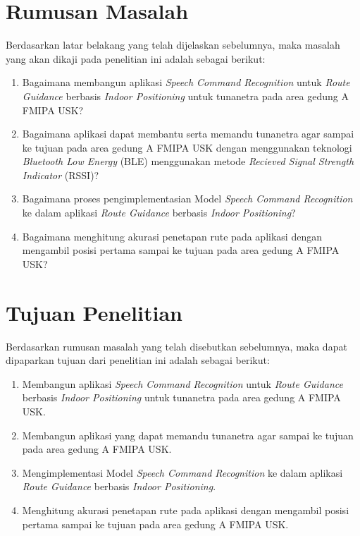 \newpage


\section{Rumusan Masalah}
Berdasarkan latar belakang yang telah dijelaskan sebelumnya, maka masalah yang akan dikaji pada penelitian ini adalah sebagai berikut:
\begin{enumerate}
	\item Bagaimana membangun aplikasi \textit{Speech Command Recognition} untuk \textit{Route Guidance} berbasis \textit{Indoor Positioning} untuk tunanetra pada area gedung A FMIPA USK?
	\item Bagaimana aplikasi dapat membantu serta memandu tunanetra agar sampai ke tujuan pada area gedung A FMIPA USK dengan menggunakan teknologi \textit{Bluetooth Low Energy }(BLE) menggunakan metode \textit{Recieved Signal Strength Indicator} (RSSI)?
	\item Bagaimana proses pengimplementasian Model \textit{Speech Command Recognition} ke dalam aplikasi \textit{Route Guidance} berbasis \textit{Indoor Positioning}?
	\item Bagaimana menghitung akurasi penetapan rute pada aplikasi dengan mengambil posisi pertama sampai ke tujuan pada area gedung A FMIPA USK?
\end{enumerate}

\section{Tujuan Penelitian}
Berdasarkan rumusan masalah yang telah disebutkan sebelumnya, maka dapat dipaparkan tujuan dari penelitian ini adalah sebagai berikut: 
\begin{enumerate}
	\item Membangun aplikasi \textit{Speech Command Recognition} untuk \textit{Route Guidance} berbasis \textit{Indoor Positioning} untuk tunanetra pada area gedung A FMIPA USK.
	\item Membangun aplikasi yang dapat memandu tunanetra agar sampai ke tujuan pada area gedung A FMIPA USK.
	\item Mengimplementasi Model \textit{Speech Command Recognition} ke dalam aplikasi \textit{Route Guidance} berbasis \textit{Indoor Positioning}.
	\item Menghitung akurasi penetapan rute pada aplikasi dengan mengambil posisi pertama sampai ke tujuan pada area gedung A FMIPA USK.
\end{enumerate}


